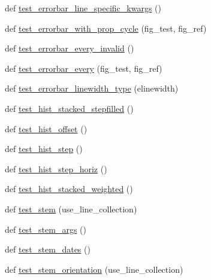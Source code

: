 \begin{DoxyCompactItemize}
\item 
def \hyperlink{namespacematplotlib_1_1tests_1_1test__axes_ad45953d1ae9fa0f2a5a4f05f0cae8a76}{test\+\_\+errorbar\+\_\+line\+\_\+specific\+\_\+kwargs} ()
\item 
def \hyperlink{namespacematplotlib_1_1tests_1_1test__axes_a9f34b291c2ba015fd1cd011ac35579e4}{test\+\_\+errorbar\+\_\+with\+\_\+prop\+\_\+cycle} (fig\+\_\+test, fig\+\_\+ref)
\item 
def \hyperlink{namespacematplotlib_1_1tests_1_1test__axes_a26ce5aaaad237bc0292d8666c3cac6c0}{test\+\_\+errorbar\+\_\+every\+\_\+invalid} ()
\item 
def \hyperlink{namespacematplotlib_1_1tests_1_1test__axes_a6ec2fff336f0f20b4f91918a6a98ce12}{test\+\_\+errorbar\+\_\+every} (fig\+\_\+test, fig\+\_\+ref)
\item 
def \hyperlink{namespacematplotlib_1_1tests_1_1test__axes_ac78189c9fb420d3e3984c7e9da710395}{test\+\_\+errorbar\+\_\+linewidth\+\_\+type} (elinewidth)
\item 
def \hyperlink{namespacematplotlib_1_1tests_1_1test__axes_a6db13eb0f176048d252e53eba4be95cb}{test\+\_\+hist\+\_\+stacked\+\_\+stepfilled} ()
\item 
def \hyperlink{namespacematplotlib_1_1tests_1_1test__axes_aca6ea84268dcc3809881eb20cbd0ff6a}{test\+\_\+hist\+\_\+offset} ()
\item 
def \hyperlink{namespacematplotlib_1_1tests_1_1test__axes_a59ad9f3b7f0de8f130bb352ec4ec3c28}{test\+\_\+hist\+\_\+step} ()
\item 
def \hyperlink{namespacematplotlib_1_1tests_1_1test__axes_a857c35fbd2b5529ed0dec332546f8fa0}{test\+\_\+hist\+\_\+step\+\_\+horiz} ()
\item 
def \hyperlink{namespacematplotlib_1_1tests_1_1test__axes_af27991a33e9ceee3e70e9e802ee5eb17}{test\+\_\+hist\+\_\+stacked\+\_\+weighted} ()
\item 
def \hyperlink{namespacematplotlib_1_1tests_1_1test__axes_a57e626101095ba93cc2db29ba77cdcb8}{test\+\_\+stem} (use\+\_\+line\+\_\+collection)
\item 
def \hyperlink{namespacematplotlib_1_1tests_1_1test__axes_a5d4b34a453cd3ce1f7735e167fe191fc}{test\+\_\+stem\+\_\+args} ()
\item 
def \hyperlink{namespacematplotlib_1_1tests_1_1test__axes_a7dab4bb58f0b5446ab60152c43bf4ccc}{test\+\_\+stem\+\_\+dates} ()
\item 
def \hyperlink{namespacematplotlib_1_1tests_1_1test__axes_a32d7a46dc3e1abcdd8e3408f6f9dbd80}{test\+\_\+stem\+\_\+orientation} (use\+\_\+line\+\_\+collection)

\end{DoxyCompactItemize}
